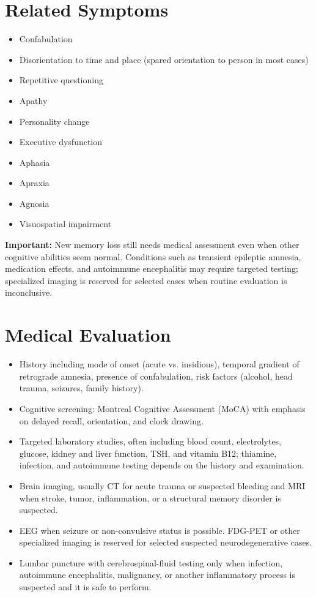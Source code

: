 \section*{Related Symptoms}
\begin{itemize}
 \item Confabulation
 \item Disorientation to time and place (spared orientation to person in most cases)
 \item Repetitive questioning
 \item Apathy
 \item Personality change
 \item Executive dysfunction
 \item Aphasia
 \item Apraxia
 \item Agnosia
 \item Visuospatial impairment
\end{itemize}
\textbf{Important:} New memory loss still needs medical assessment even when other cognitive abilities seem normal. Conditions such as transient epileptic amnesia, medication effects, and autoimmune encephalitis may require targeted testing; specialized imaging is reserved for selected cases when routine evaluation is inconclusive.

\section*{Medical Evaluation}
\begin{itemize}
 \item History including mode of onset (acute vs. insidious), temporal gradient of retrograde amnesia, presence of confabulation, risk factors (alcohol, head trauma, seizures, family history).
 \item Cognitive screening: Montreal Cognitive Assessment (MoCA) with emphasis on delayed recall, orientation, and clock drawing.
 \item Targeted laboratory studies, often including blood count, electrolytes, glucose, kidney and liver function, TSH, and vitamin B12; thiamine, infection, and autoimmune testing depends on the history and examination.
 \item Brain imaging, usually CT for acute trauma or suspected bleeding and MRI when stroke, tumor, inflammation, or a structural memory disorder is suspected.
 \item EEG when seizure or non-convulsive status is possible. FDG-PET or other specialized imaging is reserved for selected suspected neurodegenerative cases.
 \item Lumbar puncture with cerebrospinal-fluid testing only when infection, autoimmune encephalitis, malignancy, or another inflammatory process is suspected and it is safe to perform.
\end{itemize}

